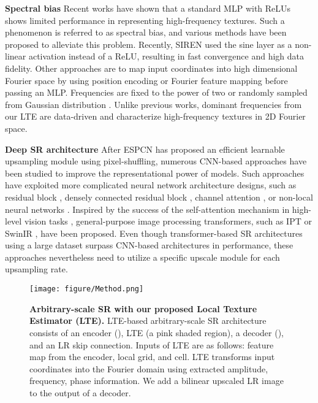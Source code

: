 \documentclass[10pt,twocolumn,letterpaper]{article}
\begin{document}
\textbf{Spectral bias} Recent works \cite{DBLP:conf/icml/RahamanBADLHBC19, sitzmann2019siren, mildenhall2020nerf, tancik2020fourfeat} have shown that a standard MLP with ReLUs shows limited performance in representing high-frequency textures. Such a phenomenon is referred to as spectral bias, and various methods have been proposed to alleviate this problem. Recently, SIREN \cite{sitzmann2019siren} used the sine layer as a non-linear activation instead of a ReLU, resulting in fast convergence and high data fidelity. Other approaches \cite{mildenhall2020nerf, tancik2020fourfeat} are to map input coordinates into high dimensional Fourier space by using position encoding or Fourier feature mapping before passing an MLP. Frequencies are fixed to the power of two \cite{mildenhall2020nerf} or randomly sampled from Gaussian distribution \cite{tancik2020fourfeat}. Unlike previous works, dominant frequencies from our LTE are data-driven and characterize high-frequency textures in 2D Fourier space.

{\bf Deep SR architecture} After ESPCN \cite{DBLP:journals/corr/ShiCHTABRW16} has proposed an efficient learnable upsampling module using pixel-shuffling, numerous CNN-based approaches \cite{Lim_2017_CVPR_Workshops, zhang2018rcan, zhang2018residual, dai2019second, Mei_2021_CVPR} have been studied to improve the representational power of models. Such approaches have exploited more complicated neural network architecture designs, such as residual block \cite{Lim_2017_CVPR_Workshops}, densely connected residual block \cite{zhang2018residual}, channel attention \cite{zhang2018rcan, dai2019second}, or non-local neural networks \cite{Mei_2021_CVPR}. Inspired by the success of the self-attention mechanism in high-level vision tasks \cite{DBLP:conf/iclr/DosovitskiyB0WZ21, liu2021swin}, general-purpose image processing transformers, such as IPT \cite{DBLP:conf/cvpr/Chen000DLMX0021} or SwinIR \cite{liang2021swinir}, have been proposed. Even though transformer-based SR architectures using a large dataset surpass CNN-based architectures in performance, these approaches nevertheless need to utilize a specific upscale module for each upsampling rate.

\begin{figure*}[t]
\centering
\texttt{[image: figure/Method.png]}
\caption{\textbf{Arbitrary-scale SR with our proposed Local Texture Estimator (LTE).} LTE-based arbitrary-scale SR architecture consists of an encoder (), LTE (a pink shaded region), a decoder (), and an LR skip connection. Inputs of LTE are as follows: feature map from the encoder, local grid, and cell. LTE transforms input coordinates into the Fourier domain using extracted amplitude, frequency, phase information. We add a bilinear upscaled LR image to the output of a decoder.}
\label{fig:flowchart}
\end{figure*}
\end{document}
